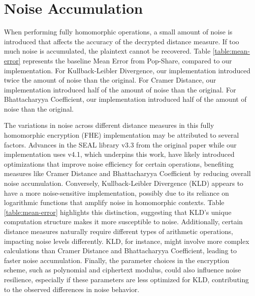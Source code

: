 \section{Noise Accumulation}

When performing fully homomorphic operations, a small amount of noise is introduced that affects the accuracy of the decrypted distance measure. If too much noise is accumulated, the plaintext cannot be recovered. Table \ref{table:mean-error} represents the baseline Mean Error from Pop-Share, compared to our implementation. For Kullback-Leibler Divergence, our implementation introduced twice the amount of noise than the original. For Cramer Distance, our implementation introduced half of the amount of noise than the original. For Bhattacharyya Coefficient, our implementation introduced half of the amount of noise than the original.



The variations in noise across different distance measures in this fully homomorphic encryption (FHE) implementation may be attributed to several factors. Advances in the SEAL library v3.3 from the original paper while our implementation uses v4.1, which underpins this work, have likely introduced optimizations that improve noise efficiency for certain operations, benefiting measures like Cramer Distance and Bhattacharyya Coefficient by reducing overall noise accumulation. Conversely, Kullback-Leibler Divergence (KLD) appears to have a more noise-sensitive implementation, possibly due to its reliance on logarithmic functions that amplify noise in homomorphic contexts. Table \ref{table:mean-error} highlights this distinction, suggesting that KLD’s unique computation structure makes it more susceptible to noise. Additionally, certain distance measures naturally require different types of arithmetic operations, impacting noise levels differently. KLD, for instance, might involve more complex calculations than Cramer Distance and Bhattacharyya Coefficient, leading to faster noise accumulation. Finally, the parameter choices in the encryption scheme, such as polynomial and ciphertext modulus, could also influence noise resilience, especially if these parameters are less optimized for KLD, contributing to the observed differences in noise behavior.
